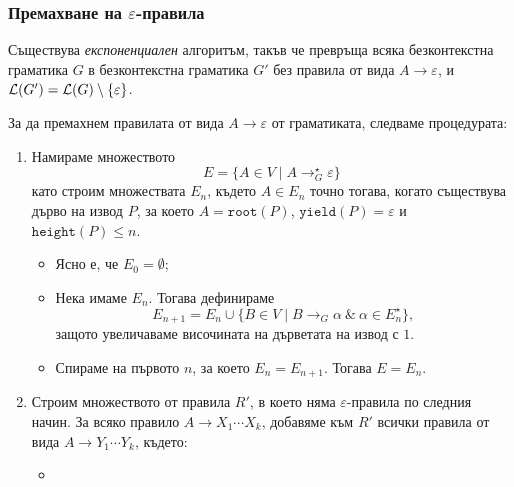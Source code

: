 \subsubsection*{Премахване на $\varepsilon$-правила}

\begin{lemma}
  Съществува {\em експоненциален} алгоритъм, такъв че превръща всяка безконтекстна граматика $G$ в безконтекстна граматика $G'$ без правила от вида $A \to \varepsilon$,
  и $\mathcal{L}(G') = \mathcal{L}(G) \setminus \{\varepsilon\}$.
\end{lemma}
\begin{hint}
  За да премахнем правилата от вида $A \to \varepsilon$ от граматиката, следваме процедурата:
  \begin{enumerate}[1)]
  \item 
    Намираме множеството
    \[E = \{A \in V \mid A \to^\star_G \varepsilon\}\]
    като строим множествата $E_n$, където
    $A \in E_n$ точно тогава, когато съществува дърво на извод $P$, за което
    $A = \texttt{root}(P)$, $\texttt{yield}(P) = \varepsilon$ и $\texttt{height}(P) \leq n$.
    \begin{itemize}[-]
    \item
      Ясно е, че $E_0 = \emptyset$;
    \item
      Нека имаме $E_n$. Тогава дефинираме
      \[E_{n+1} = E_n \cup \{ B \in V \mid B \to_G \alpha\ \&\ \alpha \in E^\star_n\},\]
      защото увеличаваме височината на дърветата на извод с $1$.
    \item
      Спираме на първото $n$, за което $E_n = E_{n+1}$. Тогава $E = E_n$.    
    \end{itemize}
  \item
    Строим множеството от правила $R'$, в което няма $\varepsilon$-правила по следния начин.
    За всяко правило $A \to X_1\cdots X_k$,
    добавяме към $R'$ всички правила от вида $A \to Y_1\cdots Y_k$, където:
    \begin{itemize}[-]
    \item 

\end{itemize}
\end{enumerate}
\end{hint}
